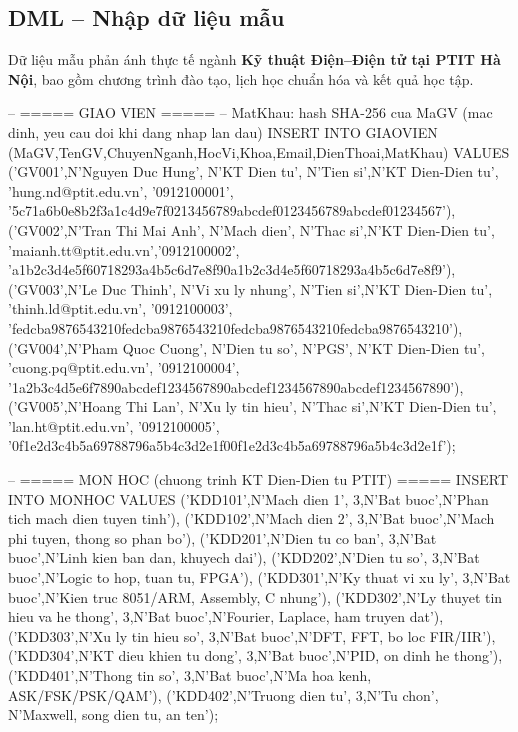 \documentclass[13pt, a4paper]{article}
\begin{document}
\subsection{DML -- Nhập dữ liệu mẫu}

\noindent Dữ liệu mẫu phản ánh thực tế ngành \textbf{Kỹ thuật Điện--Điện tử tại PTIT Hà Nội}, bao gồm chương trình đào tạo, lịch học chuẩn hóa và kết quả học tập.

\begin{sqlbox}
-- ===== GIAO VIEN =====
-- MatKhau: hash SHA-256 cua MaGV (mac dinh, yeu cau doi khi dang nhap lan dau)
INSERT INTO GIAOVIEN (MaGV,TenGV,ChuyenNganh,HocVi,Khoa,Email,DienThoai,MatKhau) VALUES
('GV001',N'Nguyen Duc Hung',  N'KT Dien tu',    N'Tien si',N'KT Dien-Dien tu',
 'hung.nd@ptit.edu.vn',  '0912100001',
 '5c71a6b0e8b2f3a1c4d9e7f0213456789abcdef0123456789abcdef01234567'),
('GV002',N'Tran Thi Mai Anh', N'Mach dien',      N'Thac si',N'KT Dien-Dien tu',
 'maianh.tt@ptit.edu.vn','0912100002',
 'a1b2c3d4e5f60718293a4b5c6d7e8f90a1b2c3d4e5f60718293a4b5c6d7e8f9'),
('GV003',N'Le Duc Thinh',     N'Vi xu ly nhung', N'Tien si',N'KT Dien-Dien tu',
 'thinh.ld@ptit.edu.vn', '0912100003',
 'fedcba9876543210fedcba9876543210fedcba9876543210fedcba9876543210'),
('GV004',N'Pham Quoc Cuong',  N'Dien tu so',     N'PGS',    N'KT Dien-Dien tu',
 'cuong.pq@ptit.edu.vn', '0912100004',
 '1a2b3c4d5e6f7890abcdef1234567890abcdef1234567890abcdef1234567890'),
('GV005',N'Hoang Thi Lan',    N'Xu ly tin hieu', N'Thac si',N'KT Dien-Dien tu',
 'lan.ht@ptit.edu.vn',   '0912100005',
 '0f1e2d3c4b5a69788796a5b4c3d2e1f00f1e2d3c4b5a69788796a5b4c3d2e1f');

-- ===== MON HOC (chuong trinh KT Dien-Dien tu PTIT) =====
INSERT INTO MONHOC VALUES
('KDD101',N'Mach dien 1',                    3,N'Bat buoc',N'Phan tich mach dien tuyen tinh'),
('KDD102',N'Mach dien 2',                    3,N'Bat buoc',N'Mach phi tuyen, thong so phan bo'),
('KDD201',N'Dien tu co ban',                 3,N'Bat buoc',N'Linh kien ban dan, khuyech dai'),
('KDD202',N'Dien tu so',                     3,N'Bat buoc',N'Logic to hop, tuan tu, FPGA'),
('KDD301',N'Ky thuat vi xu ly',              3,N'Bat buoc',N'Kien truc 8051/ARM, Assembly, C nhung'),
('KDD302',N'Ly thuyet tin hieu va he thong', 3,N'Bat buoc',N'Fourier, Laplace, ham truyen dat'),
('KDD303',N'Xu ly tin hieu so',              3,N'Bat buoc',N'DFT, FFT, bo loc FIR/IIR'),
('KDD304',N'KT dieu khien tu dong',          3,N'Bat buoc',N'PID, on dinh he thong'),
('KDD401',N'Thong tin so',                   3,N'Bat buoc',N'Ma hoa kenh, ASK/FSK/PSK/QAM'),
('KDD402',N'Truong dien tu',                 3,N'Tu chon', N'Maxwell, song dien tu, an ten');


\end{sqlbox}
\end{document}
